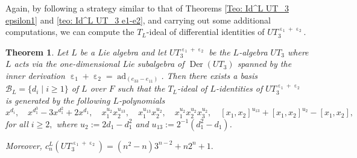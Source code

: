 \documentclass[a4paper,reqno]{amsart}
\newtheorem{theorem}{Theorem}
\theoremstyle{definition}
\numberwithin{equation}{section}
\numberwithin{theorem}{section}
\DeclareMathOperator{\e}{\varepsilon}
\DeclareMathOperator{\ad}{ad}
\DeclareMathOperator{\D}{Der}
\begin{document}
Again, by following a strategy similar to that of Theorems \ref{Teo: Id^L UT_3 epsilon1} and \ref{teo: Id^L UT_3 e1-e2}, and carrying out some additional computations, we can compute the $T_L$-ideal of differential identities of $UT_3^{\e_1+\e_2}$.


\begin{theorem}\label{teo: Id^L UT_3 e1+e2}
   Let $L$ be a Lie algebra and let $UT_3^{\e_1+\e_2}$  be the $L$-algebra $UT_3$ where $L$ acts via the one-dimensional Lie subalgebra of $\D(UT_3)$ spanned by the inner derivation  $\e_1+\e_2 =\ad_{(e_{33}-e_{11})}$. Then 
there exists a basis $\mathcal{B}_L=\{d_i \mid i \geq 1\}$ of $L$ over $F$ such that 
   the $T_L$-ideal of $L$-identities of $UT_3^{\e_1+\e_2}$ is generated by the following $L$-polynomials
   \begin{equation*}
        x^{d_i}, \quad x^{d_1^3}-3x^{d_1^2}+2x^{d_1},\quad x_1^{u_{2}}x_2^{u_{13}}, \quad x_1^{u_{13}}x_2^{u_{2}}, \quad  x_1^{u_{2}} x_2^{u_{2}}x_3^{u_{2}}, \quad  [x_1,x_2]^{u_{13}}+ [x_1,x_2]^{u_{2}} - [x_1,x_2],
    \end{equation*}
for all $i\geq 2,$ where $u_{2}:=2d_1 -d_1^2$ and $u_{13}:=2^{-1}(d_1^2 - d_1)$. 

Moreover, $c_n^L(UT_3^{\e_1 +\e_2})= (n^2-n)3^{n-2}+n2^n+1.$ 
\end{theorem}
\end{document}
